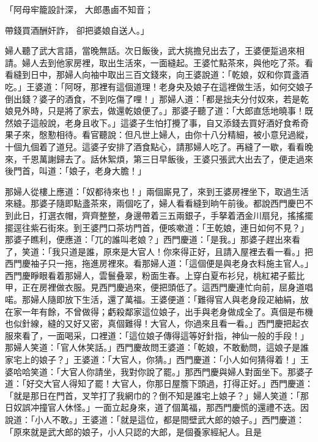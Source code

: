 「阿母牢籠設計深，  大郎愚鹵不知音；

帶錢買酒酬奸詐，  卻把婆娘自送人。」

婦人聽了武大言語，當晚無話。次日飯後，武大挑擔兒出去了，王婆便踅過來相請。婦人去到他家房裡，取出生活來，一面縫起。王婆忙點茶來，與他吃了茶。看看縫到日中，那婦人向袖中取出三百文錢來，向王婆說道：「乾娘，奴和你買盞酒吃。」王婆道：「阿呀，那裡有這個道理！老身央及娘子在這裡做生活，如何交娘子倒出錢？婆子的酒食，不到吃傷了哩！」那婦人道：「都是拙夫分付奴來，若是乾娘見外時，只是將了家去，做還乾娘便了。」那婆子聽了道：「大郎直恁地曉事！既然娘子這般說，老身且收下。」這婆子生怕打攪了事，自又添錢去買好酒好食希奇果子來，慇懃相待。看官聽說：但凡世上婦人，由你十八分精細，被小意兒過縱，十個九個着了道兒。這婆子安排了酒食點心，請那婦人吃了。再縫了一歇，看看晚來，千恩萬謝歸去了。話休絮煩，第三日早飯後，王婆只張武大出去了，便走過來後門首，叫道：「娘子，老身大膽！」

那婦人從樓上應道：「奴都待來也！」兩個廝見了，來到王婆房裡坐下，取過生活來縫。那婆子隨即點盞茶來，兩個吃了，婦人看看縫到晌午前後。都說西門慶巴不到此日，打選衣帽，齊齊整整，身邊帶着三五兩銀子，手拏着洒金川扇兒，搖搖擺擺逕往紫石街來。到王婆門口茶坊門首，便咳嗽道：「王乾娘，連日如何不見？」那婆子瞧利，便應道：「兀的誰叫老娘？」西門慶道：「是我。」那婆子趕出來看了，笑道：「我只道是誰，原來是大官人！你來得正好，且請入屋裡去看一看。」把西門慶袖子只一拖，拖進房裡來。看那婦人道：「這個便是與老身衣料施主官人。」西門慶睜眼看着那婦人，雲鬟叠翠，粉面生春。上穿白夏布衫兒，桃紅裙子藍比甲，正在房裡做衣服。見西門慶過來，便把頭低了。這西門慶連忙向前，屈身道唱喏。那婦人隨即放下生活，還了萬福。王婆便道：「難得官人與老身段疋紬絹，放在家一年有餘，不曾做得；虧殺鄰家這位娘子，出手與老身做成全了。真個是布機也似針線，縫的又好又密，真個難得！大官人，你過來且看一看。」西門慶把起衣服來看了，一面喝采，口裡道：「這位娘子傳得這等好針指，神仙一般的手段！」那婦人笑道：「官人休笑話。」西門慶故問王婆道：「乾娘，不敢動問，這娘子是誰家宅上的娘子？」王婆道：「大官人，你猜。」西門慶道：「小人如何猜得着！」王婆哈哈笑道：「大官人你請坐，我對你說了罷。」那西門慶與婦人對面坐下。那婆子道：「好交大官人得知了罷！大官人，你那日屋簷下頭過，打得正好。」西門慶道：「就是那日在門首，叉竿打了我網巾的？倒不知是誰宅上娘子？」婦人笑道：「那日奴誤冲撞官人休怪。」一面立起身來，道了個萬福，那西門慶慌的還禮不迭。因說道：「小人不敢。」王婆道：「就是這位，都是間壁武大郎的娘子。」西門慶道：「原來就是武大郎的娘子，小人只認的大郎，是個養家經紀人。且是

